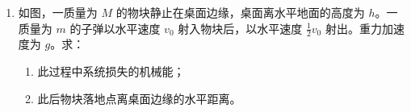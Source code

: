 \documentclass[\gkver]{gaokaozhenti}
\begin{document}
\begin{enumerate}
\begin{enumerate}
	④记下两个电压表 $V_{1}$ 和 $V_{2}$ 的读数 $U_{1}$ 和 $U_{2}$。

	⑤多次改变滑动变阻器滑动头的位置，记下 $V_{1}$ 和 $V_{2}$ 的多组读数 $U_{1}$ 和 $U_{2}$。

	⑥求 $R_{x}$ 的平均值。回答下列问题：

	（Ⅰ）根据实物连线图在虚线框内画出实验的电路图，其中电阻箱的符号为图 b、滑动变阻器的符号为图 c，其余器材用通用的符号表示。

	{figs/22b.png}
	{figs/22c.png}

	（Ⅱ）不计电压表内阻的影响，用 $U_{1}$、$U_{2}$ 和 $R_{0}$ 表示 $R_{x}$ 的公式为 $R_{x}=$ \tkanswer[3cm]{}。

	（Ⅲ）考虑电压表内阻的影响，用 $U_{1}$、$U_{2}$、$R_{0}$、$V_{1}$ 的内阻 $r_{1}$、$V_{2}$ 内阻 $r_{2}$ 表示 $R_{x}$ 的公式为 $R_{x}=$ \tkanswer[4cm]{}。
\end{enumerate}



\item
如图，一质量为 $M$ 的物块静止在桌面边缘，桌面离水平地面的高度为 $h$。一质量为 $m$ 的子弹以水平速度 $v_{0}$ 射入物块后，以水平速度 $\frac{1}{2}v_{0}$ 射出。重力加速度为 $g$。求：

\begin{enumerate}
	\item
	此过程中系统损失的机械能；
	\item
	此后物块落地点离桌面边缘的水平距离。
\end{enumerate}


\end{enumerate}
\end{document}
